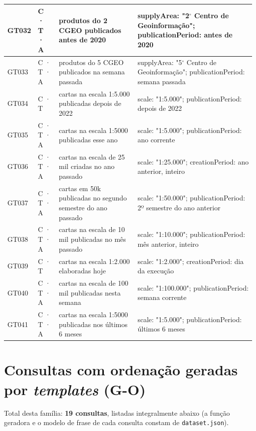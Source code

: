 {\begin{longtable}{|p{1.1cm}|p{1.3cm}|p{5.4cm}|p{6.3cm}|}
GT032 & C · T · A & produtos do 2 CGEO publicados antes de 2020 & supplyArea: "2$^\circ$ Centro de Geoinformação"; publicationPeriod: antes de 2020 \\ \hline
GT033 & C · T · A & produtos do 5 CGEO publicados na semana passada & supplyArea: "5$^\circ$ Centro de Geoinformação"; publicationPeriod: semana passada \\ \hline
GT034 & C · T & cartas na escala 1:5.000 publicadas depois de 2022 & scale: "1:5.000"; publicationPeriod: depois de 2022 \\ \hline
GT035 & C · T · A & cartas na escala 1:5000 publicadas esse ano & scale: "1:5.000"; publicationPeriod: ano corrente \\ \hline
GT036 & C · T · A & cartas na escala de 25 mil criadas no ano passado & scale: "1:25.000"; creationPeriod: ano anterior, inteiro \\ \hline
GT037 & C · T · A & cartas em 50k publicadas no segundo semestre do ano passado & scale: "1:50.000"; publicationPeriod: 2º semestre do ano anterior \\ \hline
GT038 & C · T · A & cartas na escala de 10 mil publicadas no mês passado & scale: "1:10.000"; publicationPeriod: mês anterior, inteiro \\ \hline
GT039 & C · T & cartas na escala 1:2.000 elaboradas hoje & scale: "1:2.000"; creationPeriod: dia da execução \\ \hline
GT040 & C · T · A & cartas na escala de 100 mil publicadas nesta semana & scale: "1:100.000"; publicationPeriod: semana corrente \\ \hline
GT041 & C · T · A & cartas na escala 1:5000 publicadas nos últimos 6 meses & scale: "1:5.000"; publicationPeriod: últimos 6 meses \\ \hline
\end{longtable}
\addtocounter{table}{-1}
}

\section{Consultas com ordena\c{c}\~ao geradas por \textit{templates} (G-O)}

Total desta fam\'ilia: \textbf{19 consultas}, listadas integralmente abaixo (a fun\c{c}\~ao geradora e o modelo de frase de cada consulta constam de \texttt{dataset.json}).

